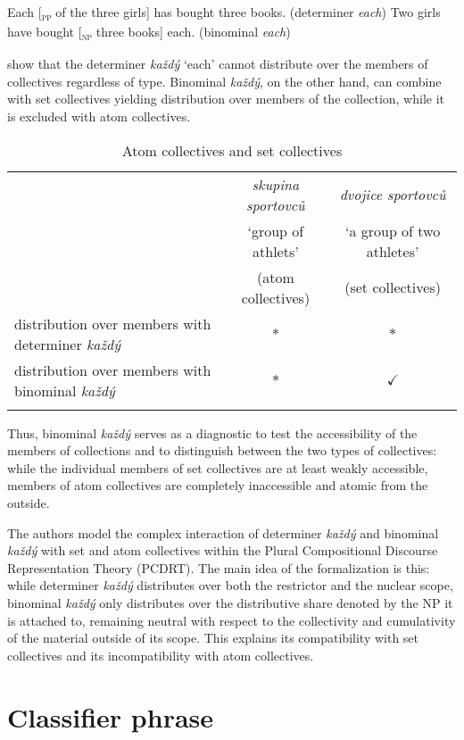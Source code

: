 \documentclass[output=paper]{langscibook}
\begin{document}
\ea \label{ex:12} \ea Each [\textsubscript{\textsc{pp}} of the three girls] has bought three books. \hfill (determiner \textit{each})\label{ex:12a}
\ex Two girls have bought [\textsubscript{\textsc{np}} three books] each. \hfill (binominal \textit{each})\label{ex:12b}
\z \z

\noindent \citeauthor{Docekal.Simik2021} show that the determiner \textit{každý} `each' cannot distribute over the members of collectives regardless of type. Binominal \textit{každý}, on the other hand, can combine with set collectives yielding distribution over members of the collection, while it is excluded with atom collectives.

\begin{table}
\centering
\begin{tabularx}{\textwidth}{Qcc}
\lsptoprule
 & \textit{skupina sportovců} & \textit{dvojice sportovců} \tabularnewline
 & `group of athlets' & `a group of two athletes' \tabularnewline
 & (atom collectives) & (set collectives) \tabularnewline
\midrule
distribution over members with determiner \textit{každý} & $*$ & $*$ \tabularnewline
\midrule
distribution over members with binominal \textit{každý}  & $*$ & $\checkmark$ \tabularnewline
\lspbottomrule
\end{tabularx}
\caption{Atom collectives and set collectives}
\label{table:3}
\end{table}

Thus, binominal \textit{každý} serves as a diagnostic to test the accessibility of the members of collections and to distinguish between the two types of collectives: while the individual members of set collectives are at least weakly accessible, members of atom collectives are completely inaccessible and atomic from the outside.

The authors model the complex interaction of determiner \textit{každý} and binominal \textit{každý} with set and atom collectives within the Plural Compositional Discourse Representation Theory (PCDRT). The main idea of the formalization is this: while determiner \textit{každý} distributes over both the restrictor and the nuclear scope, binominal \textit{každý} only distributes over the distributive share denoted by the NP it is attached to, remaining neutral with respect to the collectivity and cumulativity of the material outside of its scope. This explains its compatibility with set collectives and its incompatibility with atom collectives.

\section{Classifier phrase}
\end{document}
